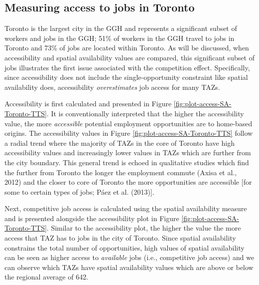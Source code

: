\documentclass[]{elsarticle} %
\begin{document}
\hypertarget{measuring-access-to-jobs-in-toronto}{%
\subsection{Measuring access to jobs in
Toronto}\label{measuring-access-to-jobs-in-toronto}}

Toronto is the largest city in the GGH and represents a significant
subset of workers and jobs in the GGH; 51\% of workers in the GGH travel
to jobs in Toronto and 73\% of jobs are located within Toronto. As will
be discussed, when accessibility and spatial availability values are
compared, this significant subset of jobs illustrates the first issue
associated with the competition effect. Specifically, since
accessibility does not include the single-opportunity constraint like
spatial availability does, accessibility \emph{overestimates} job access
for many TAZs.

Accessibility is first calculated and presented in Figure
\ref{fig:plot-access-SA-Toronto-TTS}. It is conventionally interpreted
that the higher the accessibility value, the more \emph{accessible}
potential employment opportunities are to home-based origins. The
accessibility values in Figure \ref{fig:plot-access-SA-Toronto-TTS}
follow a radial trend where the majority of TAZs in the core of Toronto
have high accessibility values and increasingly lower values in TAZs
which are further from the city boundary. This general trend is echoed
in qualitative studies which find the further from Toronto the longer
the employment commute (Axisa et al., 2012) and the closer to core of
Toronto the more opportunities are accessible {[}for some to certain
types of jobs; Páez et al. (2013){]}.

Next, competitive job access is calculated using the spatial
availability measure and is presented alongside the accessibility plot
in Figure \ref{fig:plot-access-SA-Toronto-TTS}. Similar to the
accessibility plot, the higher the value the more access that TAZ has to
jobs in the city of Toronto. Since spatial availability constrains the
total number of opportunities, high values of spatial availability can
be seen as higher access to \emph{available} jobs (i.e., competitive job
access) and we can observe which TAZs have spatial availability values
which are above or below the regional average of 642.
\end{document}
